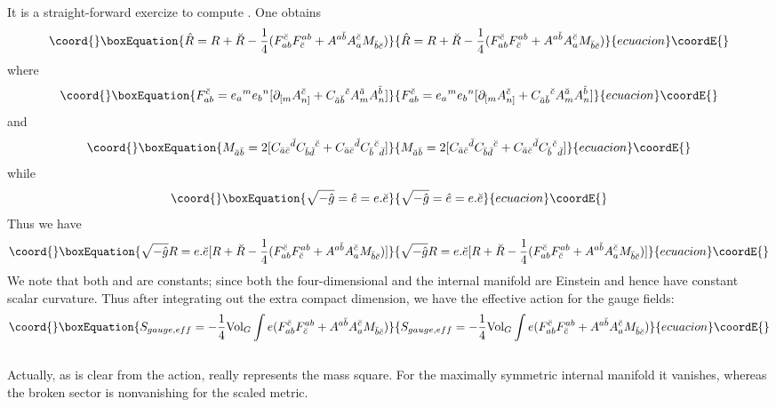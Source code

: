 \documentclass[a4paper,12pt]{article}
\begin{document}
It is a straight-forward exercize to compute \coordHE{}. One obtains
\begin{equation}\coord{}\boxEquation{
\hat{R}=R+\breve{R}-\frac{1}{4}(F_{ab}^{\cs}F^{ab}_{\cs}+A^{a\bs}A_a^{\cs}M_{\bs\cs})
}{
\hat{R}=R+\breve{R}-\frac{1}{4}(F_{ab}^{\cs}F^{ab}_{\cs}+A^{a\bs}A_a^{\cs}M_{\bs\cs})
}{ecuacion}\coordE{}\end{equation}
where
\begin{equation}\coord{}\boxEquation{
F_{ab}^{\cs}=e_a{}^me_b{}^n[\p_{[m}A^{\cs}_{n]}+C_{\as\bs}{}^{\cs}A_m^{\as}A_n^{\bs}]
}{
F_{ab}^{\cs}=e_a{}^me_b{}^n[\p_{[m}A^{\cs}_{n]}+C_{\as\bs}{}^{\cs}A_m^{\as}A_n^{\bs}]
}{ecuacion}\coordE{}\end{equation}
and
\begin{equation}\coord{}\boxEquation{
M_{\as\bs}=2[C_{\as\cs}{}^{\ds}C_{\bs\ds}{}^{\cs}+C_{\as\cs}{}^{\ds}C_{\bs}{}^{\cs}{}_{\ds}]
}{
M_{\as\bs}=2[C_{\as\cs}{}^{\ds}C_{\bs\ds}{}^{\cs}+C_{\as\cs}{}^{\ds}C_{\bs}{}^{\cs}{}_{\ds}]
}{ecuacion}\coordE{}\end{equation}
while 
\begin{equation}\coord{}\boxEquation{
\sqrt{-\hat{g}}=\hat{e}=e.\es
}{
\sqrt{-\hat{g}}=\hat{e}=e.\es
}{ecuacion}\coordE{}\end{equation}
Thus we have
\begin{equation}\coord{}\boxEquation{
\sqrt{-\hat{g}}R=e.\es[R+\breve{R}-\frac{1}{4}(F_{ab}^{\cs}F^{ab}_{\cs}+A^{a\bs}A_a^{\cs}M_{\bs\cs})]
}{
\sqrt{-\hat{g}}R=e.\es[R+\breve{R}-\frac{1}{4}(F_{ab}^{\cs}F^{ab}_{\cs}+A^{a\bs}A_a^{\cs}M_{\bs\cs})]
}{ecuacion}\coordE{}\end{equation}
We note that both \coordHE{} and \coordHE{} are constants; since both the four-dimensional and the internal manifold are Einstein and hence have constant scalar curvature. Thus after integrating out the extra compact dimension, we have the effective action for the gauge fields:
\begin{equation}\coord{}\boxEquation{
S_{gauge,eff}=-\frac{1}{4}\mbox{Vol}_G\int e(F_{ab}^{\cs}F^{ab}_{\cs}+A^{a\bs}A_a^{\cs}M_{\bs\cs})
}{
S_{gauge,eff}=-\frac{1}{4}\mbox{Vol}_G\int e(F_{ab}^{\cs}F^{ab}_{\cs}+A^{a\bs}A_a^{\cs}M_{\bs\cs})
}{ecuacion}\coordE{}\end{equation}\\
Actually, as is clear from the action, \coordHE{} really represents the mass square. For the maximally symmetric internal manifold it vanishes, whereas the broken sector is nonvanishing for the scaled metric. 
\end{document}
